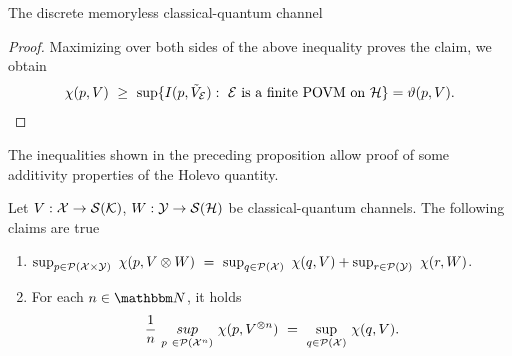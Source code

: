 \begin{section}{The discrete memoryless  classical-quantum channel}
\begin{proof}
		Maximizing over both sides of the above inequality proves the claim, we obtain
		\begin{align*} 
		\chi(p,V) \ \geq \ \sup\{ I(p,\tilde{V}_{\mathcal E}): \ {\mathcal E} \ \text{is a finite POVM on} \ {\mathcal H}\} = \vartheta(p,V).
		\end{align*}
	\end{proof}
      The inequalities shown in the preceding proposition allow proof of some additivity properties of the Holevo quantity. 
      \begin{proposition}\label{prop:holevo-additivity}
       Let $V: {\mathcal X} \rightarrow {\mathcal S}({\mathcal K})$, $W: {\mathcal Y} \rightarrow {\mathcal S}({\mathcal H})$ be classical-quantum channels. The following claims are true
       \begin{enumerate}
        \item $\sup_{p \in \cP(\cX \times \cY)} \ \chi(p, V \otimes W) \ = \ \sup_{q \in \cP(\cX)} \ \chi(q, V) + \sup_{r \in \cP(\cY)} \ \chi(r,W)$. \label{prop:holevo-additivity_1}
        \item For each $n \in \bbmN$, it holds \label{prop:holevo-additivity_2}
        \begin{align*}
         \frac{1}{n} \ \underset{p \ \in {\mathcal P}({\mathcal X}^n)}{sup} \ \chi(p, V^{\otimes n}) \ = \ \underset{q \in {\mathcal P}({\mathcal X})}{\sup} \ \chi(q,V).
        \end{align*}
       \end{enumerate}
      \end{proposition}


\end{section}
